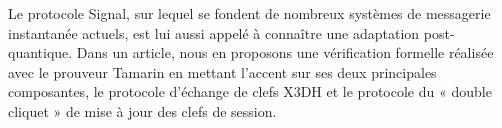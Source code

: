 {%



Le protocole Signal, sur lequel se fondent de nombreux systèmes de messagerie instantanée actuels, est lui aussi appelé à connaître une adaptation post-quantique. Dans un article, nous en proposons une vérification formelle réalisée avec le prouveur Tamarin en mettant l’accent sur ses deux principales composantes, le protocole d’échange de clefs X3DH et le protocole du « double cliquet » de mise à jour des clefs de session.\par









}

